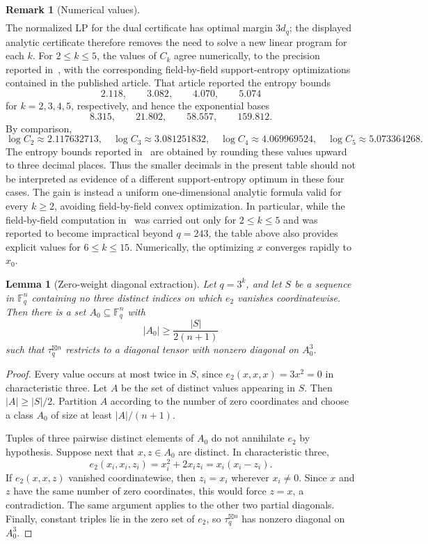 \documentclass[10pt,a4paper]{amsart}
\newtheorem{lemma}[theorem]{Lemma}
\theoremstyle{definition}
\newtheorem{remark}[theorem]{Remark}
\newcommand{\F}{\mathbb F}
\newcommand{\boxt}{\boxtimes}
\newcommand{\1}{\mathbf 1}
\begin{document}
\begin{remark}[Numerical values]
\[\begin{array}{c|r|c|r|r}
\end{array}
\]
The normalized LP for the dual certificate has optimal margin $3d_q$; the displayed analytic certificate therefore removes the need to solve a new linear program for each $k$.  For $2\le k\le5$, the values of $C_k$ agree numerically, to the precision reported in~\cite{CostaDellaFiore}, with the corresponding field-by-field support-entropy optimizations contained in the published article.  That article reported the entropy bounds
\[
 2.118,\qquad 3.082,\qquad 4.070,\qquad 5.074
\]
for $k=2,3,4,5$, respectively, and hence the exponential bases
\[
 8.315,\qquad 21.802,\qquad 58.557,\qquad 159.812.
\]
By comparison,
\[
 \log C_2\approx2.117632713,\quad
 \log C_3\approx3.081251832,\quad
 \log C_4\approx4.069969524,\quad
 \log C_5\approx5.073364268.
\]
The entropy bounds reported in~\cite{CostaDellaFiore} are obtained by rounding these values upward to three decimal places.  Thus the smaller decimals in the present table should not be interpreted as evidence of a different support-entropy optimum in these four cases.  The gain is instead a uniform one-dimensional analytic formula valid for every $k\ge2$, avoiding field-by-field convex optimization.  In particular, while the field-by-field computation in~\cite{CostaDellaFiore} was carried out only for $2\le k\le5$ and was reported to become impractical beyond $q=243$, the table above also provides explicit values for $6\le k\le15$.  Numerically, the optimizing $x$ converges rapidly to $x_0$.
\end{remark}

\begin{lemma}[Zero-weight diagonal extraction]\label{lem:q3-diagonal-extraction}
Let $q=3^k$, and let $S$ be a sequence in $\F_q^n$ containing no three distinct indices on which $e_2$ vanishes coordinatewise.  Then there is a set $A_0\subseteq\F_q^n$ with
\[
 |A_0|\ge\frac{|S|}{2(n+1)}
\]
such that $\tau_q^{\boxt n}$ restricts to a diagonal tensor with nonzero diagonal on $A_0^3$.
\end{lemma}

\begin{proof}
Every value occurs at most twice in $S$, since $e_2(x,x,x)=3x^2=0$ in characteristic three.  {Let $A$ be the set of distinct values appearing in $S$.  Then $|A|\ge|S|/2$.}  Partition $A$ according to the number of zero coordinates and choose a class $A_0$ of size at least $|A|/(n+1)$.

Tuples of three pairwise distinct elements of $A_0$ do not annihilate $e_2$ by hypothesis.  Suppose next that $x,z\in A_0$ are distinct.  In characteristic three,
\[
 e_2(x_i,x_i,z_i)=x_i^2+2x_iz_i=x_i(x_i-z_i).
\]
If $e_2(x,x,z)$ vanished coordinatewise, then $z_i=x_i$ wherever $x_i\ne0$.  Since $x$ and $z$ have the same number of zero coordinates, this would force $z=x$, a contradiction.  The same argument applies to the other two partial diagonals.  Finally, constant triples lie in the zero set of $e_2$, so $\tau_q^{\boxt n}$ has nonzero diagonal on $A_0^3$.
\end{proof}
\end{document}
